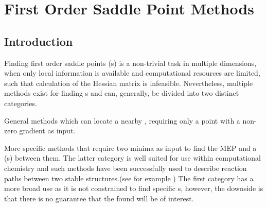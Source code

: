 \chapter{First Order Saddle Point Methods}
\label{chap:saddle-point-methods}
\textit{\expand}
\section{Introduction}
Finding first order saddle points (s) is a non-trivial task in multiple dimensions, when only local information is available and computational resources are limited, such that calculation of the Hessian matrix is infeasible.
Nevertheless, multiple methods exist for finding s and can, generally, be divided into two distinct categories.
\item General methods which can locate a nearby , requiring only a point with a non-zero gradient as input.
\item More specific methods that require two minima as input to find the MEP and a  (s) between them.
\een
The latter category is well suited for use within computational chemistry and such methods have been successfully used to describe reaction paths between two stable structures.(see for example \citemiss)
The first category has a more broad use as it is not constrained to find specific s, however, the downside is that there is no guarantee that the found  will be of interest.

\expand {}




